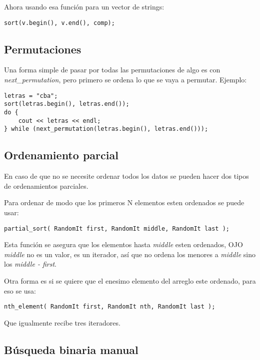 \documentclass[11pt]{article}
\begin{document}
Ahora usando esa función para un vector de strings:

\begin{lstlisting}
sort(v.begin(), v.end(), comp);
\end{lstlisting}

\subsection{Permutaciones}

Una forma simple de pasar por todas las permutaciones de algo es con \textit{next\_permutation}, pero primero se ordena lo que se vaya a permutar. Ejemplo:

\begin{lstlisting}
letras = "cba";
sort(letras.begin(), letras.end());
do {
    cout << letras << endl;
} while (next_permutation(letras.begin(), letras.end()));
\end{lstlisting}

\subsection{Ordenamiento parcial}

En caso de que no se necesite ordenar todos los datos se pueden hacer dos tipos de ordenamientos parciales.

Para ordenar de modo que los primeros N elementos esten ordenados se puede usar:

\begin{lstlisting}
partial_sort( RandomIt first, RandomIt middle, RandomIt last );
\end{lstlisting}

Esta función se asegura que los elementos hasta \textit{middle} esten ordenados, OJO \textit{middle} no es un valor, es un iterador, así que no ordena los menores a \textit{middle} sino los \textit{middle - first}.

Otra forma es si se quiere que el enesimo elemento del arreglo este ordenado, para eso se usa:

\begin{lstlisting}
nth_element( RandomIt first, RandomIt nth, RandomIt last );
\end{lstlisting}

Que igualmente recibe tres iteradores.

\subsection{Búsqueda binaria manual}
\end{document}
